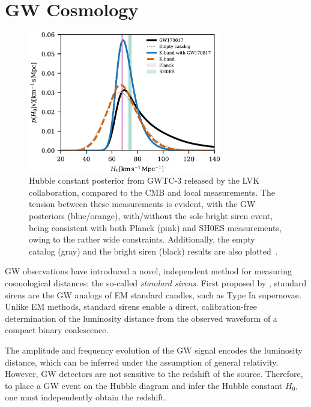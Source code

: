 \section{\Acf{GW} Cosmology}
\begin{figure}[ht]
    \centering
    \includegraphics[width=0.75\textwidth]{figures/apjac74bbf9_hr.jpg}
    \caption[Hubble tension and standard sirens.]{Hubble constant posterior from \ac{GWTC}-3 released by the \ac{LVK} collaboration, compared to the \ac{CMB} and local measurements. The tension between these measurements is evident, with the \ac{GW} posteriors (blue/orange), with/without the sole bright siren event, being consistent with both Planck (pink) and \ac{SH0ES} measurements, owing to the rather wide constraints. Additionally, the empty catalog (gray) and the bright siren (black) results are also plotted~\citep{abbott2023constraints}.}
    \label{fig:hubble_tension_gw}
\end{figure}

\ac{GW} observations have introduced a novel, independent method for measuring cosmological distances: the so-called \textit{standard sirens}. First proposed by \citet{schutz1986determining}, standard sirens are the \ac{GW} analogs of \ac{EM} standard candles, such as Type Ia supernovae. Unlike \ac{EM} methods, standard sirens enable a direct, calibration-free determination of the luminosity distance from the observed waveform of a compact binary coalescence.

The amplitude and frequency evolution of the \ac{GW} signal encodes the luminosity distance, which can be inferred under the assumption of general relativity. However, \ac{GW} detectors are not sensitive to the redshift of the source. Therefore, to place a \ac{GW} event on the Hubble diagram and infer the Hubble constant $H_0$, one must independently obtain the redshift.

